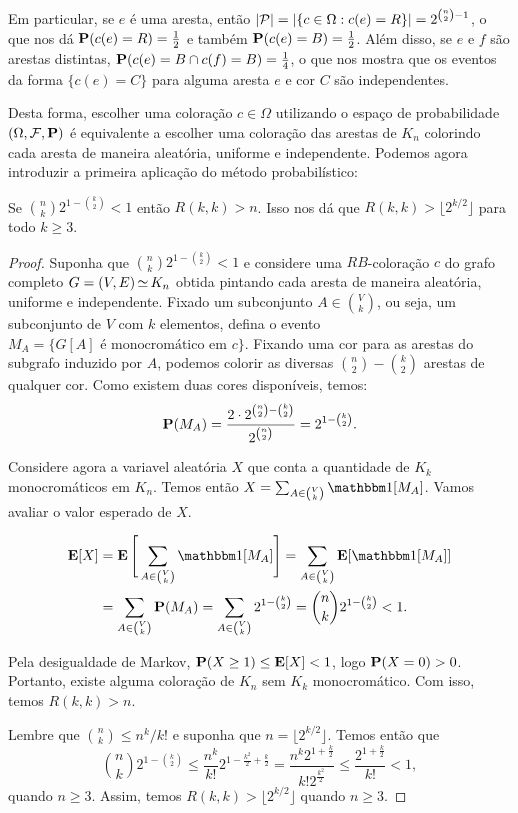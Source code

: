 Em particular, se $e$ é uma aresta, então $\left | \mathcal{P} \right | = \left | \{c \in \Omega : c(e) = R \} \right | = 2^{\binom{n}{2}-1}$, o que nos dá $\operatorname{\mathbf{P}}(c(e) = R) = \frac{1}{2}$ e também $\operatorname{\mathbf{P}}(c(e) = B) = \frac{1}{2}$.
Além disso, se $e$ e $f$ são arestas distintas, $\operatorname{\mathbf{P}}(c(e) = B \cap c(f) = B) = \frac{1}{4}$, o que nos mostra que os eventos da forma $\{c(e) = C\}$ para alguma aresta $e$ e cor $C$ são independentes.

Desta forma, escolher uma coloração $c \in \Omega$ utilizando o espaço de probabilidade $(\Omega, \mathcal{F}, \operatorname{\mathbf{P}})$ é equivalente a escolher uma coloração das arestas de $K_n$ colorindo cada aresta de maneira aleatória, uniforme e independente. Podemos agora introduzir a primeira aplicação do método probabilístico:

\begin{theorem}[Erdös, 1947]
\label{thm:prob:method}
Se $\displaystyle \binom{n}{k} 2^{1 - \binom{k}{2}} < 1$ então $R(k,k) > n$. Isso nos dá que $R(k,k) > \lfloor 2^{k/2} \rfloor$ para todo $k \geq 3$.
\end{theorem}
\begin{proof}
Suponha que $\binom{n}{k} 2^{1 - \binom{k}{2}} < 1$ e considere uma $RB$-coloração $c$ do grafo completo $G = (V,E) \operatorname{\simeq} K_n$ obtida pintando cada aresta de maneira aleatória, uniforme e independente. Fixado um subconjunto $A \in \binom{V}{k}$, ou seja, um subconjunto de $V$ com $k$ elementos, defina o evento $M_A = \{G[A] \text{ é monocromático em } c\}$. Fixando uma cor para as arestas do subgrafo induzido por $A$, podemos colorir as diversas $\binom{n}{2} - \binom{k}{2}$ arestas de qualquer cor. Como existem duas cores disponíveis, temos:
\[ \operatorname{\mathbf{P}}(M_A) = \frac{2\cdot 2^{\binom{n}{2} - \binom{k}{2}}}{2^{\binom{n}{2}}}  = 2^{1 - \binom{k}{2}}. \]

Considere agora a variavel aleatória $X$ que conta a quantidade de $K_k$ monocromáticos em $K_n$. Temos então $X = \sum_{A \in \binom{V}{k}}\ind{M_A}$. Vamos avaliar o valor esperado de $X$.

\begin{align*}
\expec[X] &= \expec\Bigg[\sum_{A \in \binom{V}{k}}\ind{M_A} \Bigg] = \sum_{A \in \binom{V}{k}} \expec[\ind{M_A}] \\
&= \sum_{A \in \binom{V}{k}} \prob(M_A) = \sum_{A \in \binom{V}{k}} 2^{1 - \binom{k}{2}}  = \binom{n}{k} 2^{1 - \binom{k}{2}} < 1.
\end{align*}

Pela desigualdade de Markov, $\operatorname{\mathbf{P}}(X \geq 1) \leq \operatorname{\mathbf{E}}[X] < 1$, logo $\operatorname{\mathbf{P}}(X = 0) > 0$. Portanto, existe alguma coloração de $K_n$ sem $K_k$ monocromático. Com isso, temos $R(k,k) > n$.

Lembre que $\binom{n}{k} \leq n^k /k!$ e suponha que $n = \lfloor 2^{k/2} \rfloor$. Temos então que
\[ \binom{n}{k}2^{1 - \binom{k}{2}} \leq \frac{n^k}{k!}2^{1 - \frac{k^2}{2} + \frac{k}{2}} = \frac{n^k 2^{1 + \frac{k}{2}}}{k!2^{\frac{k^2}{2}}} \leq \frac{2^{1 + \frac{k}{2}}}{k!} < 1, \]
quando $n \geq 3$. Assim, temos $R(k,k) > \lfloor 2^{k/2} \rfloor$ quando $n \geq 3$.
\end{proof}

